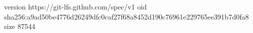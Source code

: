 version https://git-lfs.github.com/spec/v1
oid sha256:a9ad50be4776d26249dfc0caf27f68a8452d190c76961e229765ee391b7d0fa8
size 87544
